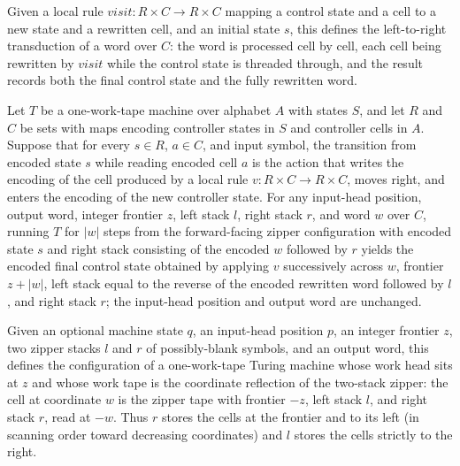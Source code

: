 \begin{definition}
\label{Turing.FinTM.sweepFold}
\leanok
Given a local rule $\mathit{visit} \colon R \times C \to R \times C$ mapping a
control state and a cell to a new state and a rewritten cell, and an initial
state $s$, this defines the left-to-right transduction of a word over $C$: the
word is processed cell by cell, each cell being rewritten by
$\mathit{visit}$ while the control state is threaded through, and the result
records both the final control state and the fully rewritten word.
\end{definition}

\begin{lemma}
\label{Turing.FinTM.sweep_run}
\leanok
{}
Let $T$ be a one-work-tape machine over alphabet $A$ with states $S$, and let $R$ and
$C$ be sets with maps encoding controller states in $S$ and controller cells in $A$.
Suppose that for every $s\in R$, $a\in C$, and input symbol, the transition from encoded
state $s$ while reading encoded cell $a$ is the action that writes the encoding of the
cell produced by a local rule $v:R\times C\to R\times C$, moves right, and enters the
encoding of the new controller state. For any input-head position, output word, integer
frontier $z$, left stack $l$, right stack $r$, and word $w$ over $C$, running $T$ for
$|w|$ steps from the forward-facing zipper configuration with encoded state $s$ and
right stack consisting of the encoded $w$ followed by $r$ yields the encoded final
control state obtained by applying $v$ successively across $w$, frontier $z+|w|$, left
stack equal to the reverse of the encoded rewritten word followed by $l$, and right
stack $r$; the input-head position and output word are unchanged.
\end{lemma}

\begin{definition}
\label{Turing.FinTM.sweepRevCfg}
\leanok
{}
Given an optional machine state $q$, an input-head position $p$, an integer
frontier $z$, two zipper stacks $l$ and $r$ of possibly-blank symbols, and an
output word, this defines the configuration of a one-work-tape Turing machine
whose work head sits at $z$ and whose work tape is the coordinate reflection
of the two-stack zipper: the cell at coordinate $w$ is the zipper tape with
frontier $-z$, left stack $l$, and right stack $r$, read at $-w$. Thus $r$
stores the cells at the frontier and to its left (in scanning order toward
decreasing coordinates) and $l$ stores the cells strictly to the right.
\end{definition}

